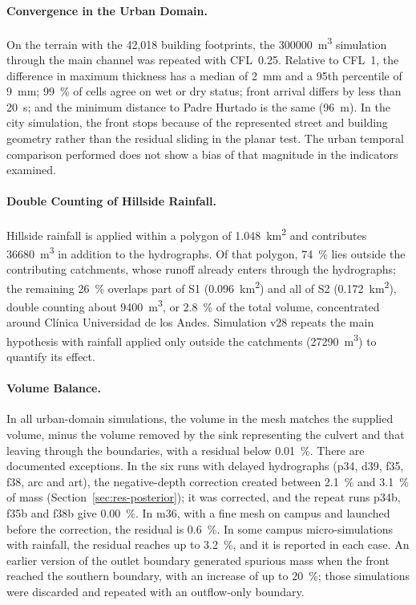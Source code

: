 \paragraph{Convergence in the Urban Domain.} On the terrain with the 42,018 building footprints, the \SI{300000}{m^3} simulation through the main channel was repeated with CFL~0.25. Relative to CFL~1, the difference in maximum thickness has a median of \SI{2}{mm} and a 95th percentile of \SI{9}{mm}; \SI{99}{\percent} of cells agree on wet or dry status; front arrival differs by less than \SI{20}{s}; and the minimum distance to Padre Hurtado is the same (\SI{96}{m}). In the city simulation, the front stops because of the represented street and building geometry rather than the residual sliding in the planar test. The urban temporal comparison performed does not show a bias of that magnitude in the indicators examined.
\paragraph{Double Counting of Hillside Rainfall.} Hillside rainfall is applied within a polygon of \SI{1.048}{km^2} and contributes \SI{36680}{m^3} in addition to the hydrographs. Of that polygon, \SI{74}{\percent} lies outside the contributing catchments, whose runoff already enters through the hydrographs; the remaining \SI{26}{\percent} overlaps part of S1 (\SI{0.096}{km^2}) and all of S2 (\SI{0.172}{km^2}), double counting about \SI{9400}{m^3}, or \SI{2.8}{\percent} of the total volume, concentrated around Clínica Universidad de los Andes. Simulation v28 repeats the main hypothesis with rainfall applied only outside the catchments (\SI{27290}{m^3}) to quantify its effect.
\paragraph{Volume Balance.} In all urban-domain simulations, the volume in the mesh matches the supplied volume, minus the volume removed by the sink representing the culvert and that leaving through the boundaries, with a residual below \SI{0.01}{\percent}. There are documented exceptions. In the six runs with delayed hydrographs (p34, d39, f35, f38, arc and art), the negative-depth correction created between \SI{2.1}{\percent} and \SI{3.1}{\percent} of mass (Section~\ref{sec:res-posterior}); it was corrected, and the repeat runs p34b, f35b and f38b give \SI{0.00}{\percent}. In m36, with a fine mesh on campus and launched before the correction, the residual is \SI[retain-explicit-plus=true]{+0.6}{\percent}. In some campus micro-simulations with rainfall, the residual reaches up to \SI{3.2}{\percent}, and it is reported in each case. An earlier version of the outlet boundary generated spurious mass when the front reached the southern boundary, with an increase of up to \SI{20}{\percent}; those simulations were discarded and repeated with an outflow-only boundary.

